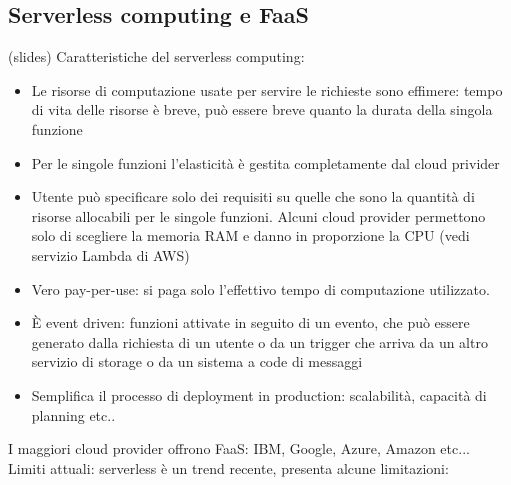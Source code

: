 \documentclass[16px]{article}
\begin{document}
\subsection{Serverless computing e FaaS}
(slides)
Caratteristiche del serverless computing:
\begin{itemize}
\item Le risorse di computazione usate per servire le richieste sono effimere: tempo di vita delle risorse è breve, può essere breve quanto la durata della singola funzione
\item Per le singole funzioni l'elasticità è gestita completamente dal cloud privider
\item Utente può specificare solo dei requisiti su quelle che sono la quantità di risorse allocabili per le singole funzioni. Alcuni cloud provider permettono solo di scegliere la memoria RAM e danno in proporzione la CPU (vedi servizio Lambda di AWS)
\item Vero pay-per-use: si paga solo l'effettivo tempo di computazione utilizzato.
\item È event driven: funzioni attivate in seguito di un evento, che può essere generato dalla richiesta di un utente o da un trigger che arriva da un altro servizio di storage o da un sistema a code di messaggi
\item Semplifica il processo di deployment in production: scalabilità, capacità di planning etc..
\end{itemize}
I maggiori cloud provider offrono FaaS: IBM, Google, Azure, Amazon etc...\\ Limiti attuali: serverless è un trend recente, presenta alcune limitazioni:
\end{document}
